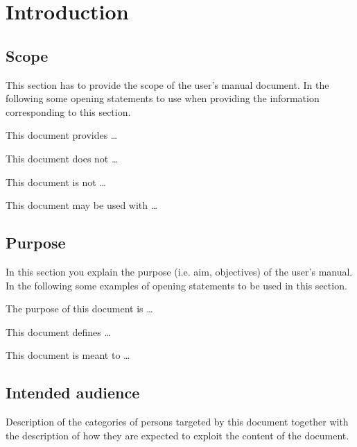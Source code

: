 \chapter{Introduction}
\label{chap:introduction}

\section{Scope}
This section has to provide the scope of the user's manual document.
In the following some opening statements to use when providing the
information corresponding to this section.

This document provides \ldots


This document does not \ldots 
 
This document is not \ldots

 
This document may be used with \ldots




\section{Purpose}
In this section you explain the purpose (i.e. aim, objectives) of the user's
manual. In the following some examples of opening statements to be used in this
section.

The purpose of this document is \ldots

This document defines \ldots

This document is meant to \ldots



\section{Intended audience}
Description of the categories of persons targeted by this document together with the description of how they are expected to exploit the content of the document.


